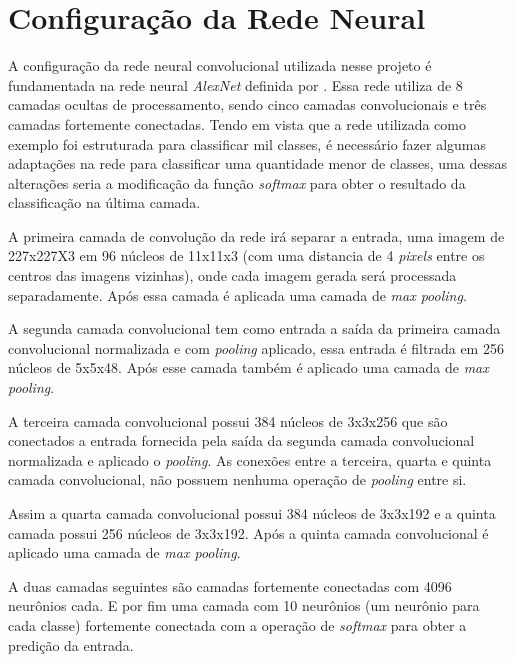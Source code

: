 
\section{Configuração da Rede Neural}
A configuração da rede neural convolucional utilizada nesse projeto é fundamentada na rede neural \textit{AlexNet} definida por . Essa rede utiliza de 8 camadas ocultas de processamento, sendo cinco camadas convolucionais e três camadas fortemente conectadas. Tendo em vista que a rede utilizada como exemplo foi estruturada para classificar mil classes, é necessário fazer algumas adaptações na rede para classificar uma quantidade menor de classes, uma dessas alterações seria a modificação da função \textit{softmax} para obter o resultado da classificação na última camada.
\par A primeira camada de convolução da rede irá separar a entrada, uma imagem de 227x227X3 em 96 núcleos de 11x11x3 (com uma distancia de 4 \textit{pixels} entre os centros das imagens vizinhas), onde cada imagem gerada será processada separadamente. Após essa camada é aplicada uma camada de \textit{max pooling}.
\par A segunda camada convolucional tem como entrada a saída da primeira camada convolucional normalizada e com \textit{pooling} aplicado, essa entrada é filtrada em 256 núcleos de 5x5x48. Após esse camada também é aplicado uma camada de \textit{max pooling}.
\par A terceira camada convolucional possui 384 núcleos de 3x3x256 que são conectados a entrada fornecida pela saída da segunda camada convolucional normalizada e aplicado o \textit{pooling}. As conexões entre a terceira, quarta e quinta camada convolucional, não possuem nenhuma operação de \textit{pooling} entre si. 
\par Assim a quarta camada convolucional possui 384 núcleos de 3x3x192 e a quinta camada possui 256 núcleos de 3x3x192. Após a quinta camada convolucional é aplicado uma camada de \textit{max pooling}.
\par A duas camadas seguintes são camadas fortemente conectadas com 4096 neurônios cada. E por fim uma camada com 10 neurônios (um neurônio para cada classe) fortemente conectada com a operação de \textit{softmax} para obter a predição da entrada.


